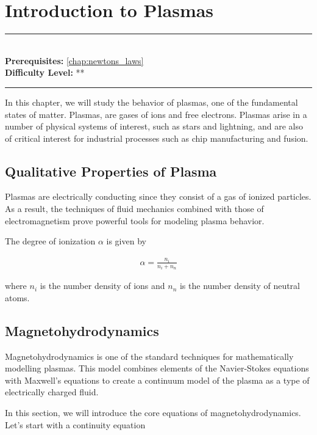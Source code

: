 \documentclass[book.tex]{subfiles}
\begin{document}
\chapter{Introduction to Plasmas}

\label{chap:plasma_physics}
\noindent\rule{11cm}{0.4pt} \\
\textbf{Prerequisites:}  \autoref{chap:newtons_laws}  \\
\textbf{Difficulty Level:} ** \\
\noindent\rule{11cm}{0.4pt}
\vspace{5mm}

In this chapter, we will study the behavior of plasmas, one of the fundamental states of matter. Plasmas, are gases of ions and free electrons. Plasmas arise in a number of physical systems of interest, such as stars and lightning, and are also of critical interest for industrial processes such as chip manufacturing and fusion.

\section{Qualitative Properties of Plasma}

Plasmas are electrically conducting since they consist of a gas of ionized particles. As a result, the techniques of fluid mechanics combined with those of electromagnetism prove powerful tools for modeling plasma behavior.

The degree of ionization $\alpha$ is given by

\begin{align} 
\alpha = \frac{n_i}{n_i + n_n}
\end{align}

where $n_i$ is the number density of ions and $n_n$ is the number density of neutral atoms.


\section{Magnetohydrodynamics}

Magnetohydrodynamics is one of the standard techniques for mathematically modelling plasmas. This model combines elements of the Navier-Stokes equations with Maxwell's equations to create a continuum model of the plasma as a type of electrically charged fluid.

In this section, we will introduce the core equations of magnetohydrodynamics. Let's start with a continuity equation 
\end{document}
